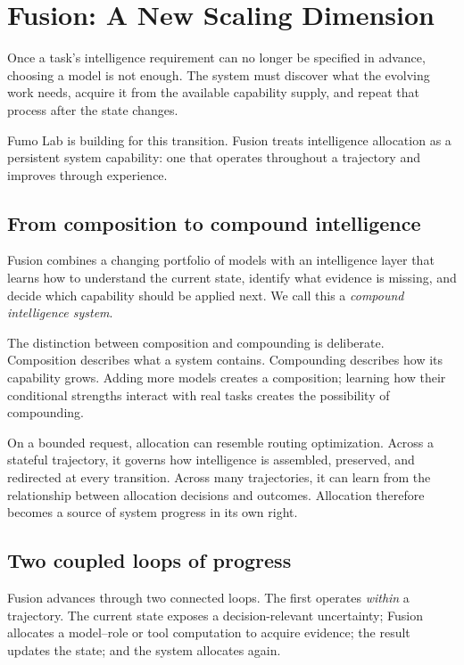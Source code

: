 \section{Fusion: A New Scaling Dimension}

Once a task's intelligence requirement can no longer be specified in advance,
choosing a model is not enough. The system must discover what the evolving work
needs, acquire it from the available capability supply, and repeat that process
after the state changes.

Fumo Lab is building \systemname for this transition. Fusion treats
intelligence allocation as a persistent system capability: one that operates
throughout a trajectory and improves through experience.

\subsection{From composition to compound intelligence}

Fusion combines a changing portfolio of models with an intelligence layer that
learns how to understand the current state, identify what evidence is missing,
and decide which capability should be applied next. We call this a
\emph{compound intelligence system}.

The distinction between composition and compounding is deliberate. Composition
describes what a system contains. Compounding describes how its capability
grows. Adding more models creates a composition; learning how their conditional
strengths interact with real tasks creates the possibility of compounding.

On a bounded request, allocation can resemble routing optimization. Across a
stateful trajectory, it governs how intelligence is assembled, preserved, and
redirected at every transition. Across many trajectories, it can learn from the
relationship between allocation decisions and outcomes. Allocation therefore
becomes a source of system progress in its own right.

\subsection{Two coupled loops of progress}

Fusion advances through two connected loops. The first operates \emph{within}
a trajectory. The current state exposes a decision-relevant uncertainty;
Fusion allocates a model--role or tool computation to acquire evidence; the
result updates the state; and the system allocates again.

